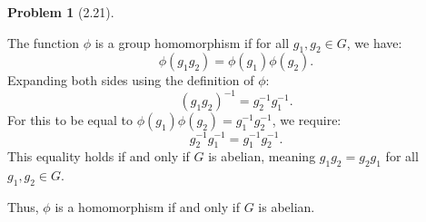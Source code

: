 \documentclass[12pt]{article}
\theoremstyle{definition}
\newtheorem{problem}{Problem}
\begin{document}
\begin{problem}[2.21]
\begin{enumerate}[label=(\alph*)]
        \begin{solution}
            The function $\phi$ is a group homomorphism if for all $g_1, g_2 \in G$, we have:
            \[
            \phi(g_1 g_2) = \phi(g_1) \phi(g_2).
            \]
            Expanding both sides using the definition of $\phi$:
            \[
            (g_1 g_2)^{-1} = g_2^{-1} g_1^{-1}.
            \]
            For this to be equal to $\phi(g_1) \phi(g_2) = g_1^{-1} g_2^{-1}$, we require:
            \[
            g_2^{-1} g_1^{-1} = g_1^{-1} g_2^{-1}.
            \]
            This equality holds if and only if $G$ is abelian, meaning $g_1 g_2 = g_2 g_1$ for all $g_1, g_2 \in G$.
    
            Thus, $\phi$ is a homomorphism if and only if $G$ is abelian.
            
        \end{solution}
    \end{enumerate}
\end{problem}
\end{document}

